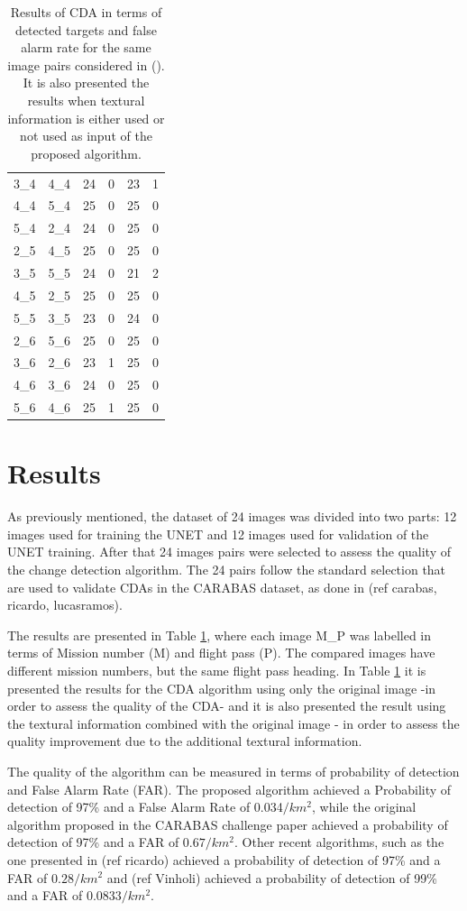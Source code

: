 \begin{table}[ht]
\begin{tabular}{c|c||c|c|c|c}
         3\_4&4\_4&24&0&23&1\\
         4\_4&5\_4&25&0&25&0\\
         5\_4&2\_4&24&0&25&0\\
         \hline
         2\_5&4\_5&25&0&25&0\\
         3\_5&5\_5&24&0&21&2\\
         4\_5&2\_5&25&0&25&0\\
         5\_5&3\_5&23&0&24&0\\
         \hline
         2\_6&5\_6&25&0&25&0\\
         3\_6&2\_6&23&1&25&0\\
         4\_6&3\_6&24&0&25&0\\
         5\_6&4\_6&25&1&25&0\\
    \end{tabular}
    \caption{Results of CDA in terms of detected targets and false alarm rate  for the same image pairs considered in (\cite{Carabas}). It is also presented  the results when textural information is either used or not used as input of the proposed algorithm.}
    \label{tab:my_table}
\end{table}

\section{Results}

As previously mentioned, the dataset of 24 images was divided into two parts: 12 images used for training the UNET and 12 images used for validation of the UNET training.
After that 24 images pairs were selected to assess the quality of the change detection algorithm. The 24 pairs follow the standard selection that are used to validate CDAs in the CARABAS dataset, as done in (ref carabas, ricardo, lucasramos).

The results are presented in Table \ref{tab:my_table}, where each image M\_P was labelled in terms of Mission number (M) and flight pass (P). The compared images have different mission numbers, but the same flight pass heading.
In Table \ref{tab:my_table} it is presented the results for the CDA algorithm using only the original image -in order to assess the quality of the CDA-  and it is also presented the result using the textural information combined with the original image -
in order to assess the quality improvement due to the additional textural information.

The quality of the algorithm can be measured in terms of probability of detection and False Alarm Rate (FAR). The proposed algorithm achieved a Probability of detection of 97\% and a False Alarm Rate of 0.034${/} km^2$, while the original algorithm proposed in the CARABAS
challenge paper achieved a probability of detection of 97\% and a FAR of  $0.67{/} km^2$. Other recent algorithms, such as the one presented in (ref ricardo) achieved a probability of detection of 97\% and a FAR of $0.28{/} km^2$ and (ref Vinholi) achieved a 
probability of detection of 99\% and a FAR of $0.0833{/} km^2$. 

